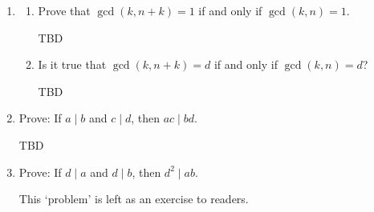 \documentclass[english,notitlepage,smartquotes]{hgbreport}
\theoremstyle{definition}
\theoremstyle{remark}
\theoremstyle{plain}
\newcommand*\circled[1]{\tikz[baseline=(char.base)]{
    \node[shape=circle,draw=red,inner sep=2pt] (char) {#1};}}
\begin{document}
\begin{enumerate}[label=\textbf{\arabic*}.]
\begin{enumerate}
\begin{proof}
$\therefore \gcd(n,n+1)=1\forall n\geq 0$.

\end{proof}
\begin{proof}
\label{proof:nn+1}
We give an alternative proof using the division algorithm\footnote{It occurred to the author at a hospital waiting room.}.

$$
\gcd(n,n+1)=\gcd(n+1,n)
$$

But $n+1=\circled{$n$}\cdot 1 + \circled{$1$}$.
$$
\therefore \gcd(n+1,n)=\gcd(n,1)=1
$$

\end{proof}
\item If $n>0$, what can $\gcd(n,n+2)$ be?

\label{pr:110b}
It has got to be either 0 or 1.
\begin{proof}
We argue as in the above (alternative) proof (\ref{proof:nn+1}).

\begin{align*}
n&=\circled{$n+2$}\cdot 0+\circled{$n$}\\
n+2&=\circled{$n$}\cdot 1+\circled{2}
\end{align*}

$\therefore\gcd(n,n+2)=\gcd(n,2)$.

\[
\gcd(n,2)=
\begin{cases}
1& \text{if $n$ is odd}, \\
2& \text{otherwise}
\end{cases}
\]

\end{proof}
\end{enumerate}
\item 
\begin{enumerate}
\item Prove that $\gcd(k,n+k)=1$ if and only if $\gcd(k,n)=1$.

TBD

\item Is it true that $\gcd(k,n+k)=d$ if and only if $\gcd(k,n)=d$?

TBD
\end{enumerate}

\item Prove: If $a\mid b$ and $c\mid d$, then $ac\mid bd$.

TBD

\item Prove: If $d\mid a$ and $d\mid b$, then $d^2\mid ab$.

This `problem' is left as an exercise to readers.


\end{enumerate}
\end{document}
